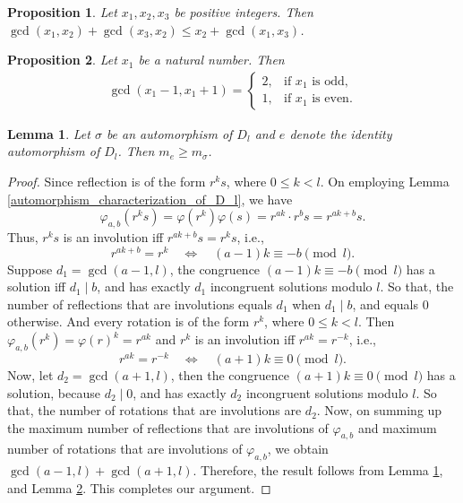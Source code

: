 \documentclass[10pt,a4paper]{amsart}
\newtheorem{lemma}{Lemma}
\newtheorem{proposition}{Proposition}
\begin{document}
    \begin{proposition}\label{gcd_main_supporting_result}
        Let $x_1, x_2, x_3$ be positive integers. Then $\gcd (x_1, x_2) + \gcd (x_3, x_2) \leq x_2 + \gcd (x_1,x_3)$.
    \end{proposition}

    \begin{proposition}\label{gcd_secondary_supporting_result}
        Let $x_1$ be a natural number. Then
        \begin{align*}
            \gcd(x_1-1,x_1+1)=
            \begin{cases}
                2, & \text{if $x_1$ is odd},\\[4pt]
                1, & \text{if $x_1$ is even}.
            \end{cases}
        \end{align*}
    \end{proposition}

       \begin{lemma}\label{identity_greater_other}
            Let $\sigma$ be an automorphism of $D_l$ and $e$ denote the identity automorphism of $D_l$. Then $m_e \geq m_{\sigma}$.
        \end{lemma}

        \begin{proof}
            
             Since reflection is of the form \(r^ks \), where \(0\le k<l\). On employing Lemma \ref{automorphism_characterization_of_D_l}, we have
             \[
                \varphi_{a,b}(r^ks)=\varphi(r^k)\varphi(s) = r^{ak}\cdot r^bs  = r^{ak+b}s.
             \]
            Thus, \(r^ks\) is an involution iff \(r^{ak+b}s =  r^ks\), i.e.,
            \[
                r^{ak+b} = r^k \quad\Longleftrightarrow\quad (a-1)k \equiv -b \pmod l. \tag{1}
            \]
            Suppose $d_1=\gcd(a-1,l)$, the congruence \((a-1)k\equiv -b\pmod l\) has a solution iff \(d_1\mid b\), and has exactly \(d_1\) incongruent solutions modulo \(l\). So that, the number of reflections that are involutions equals \(d_1\) when \(d_1\mid b\), and equals \(0\) otherwise.
            And every rotation is of the form \(r^k\), where \(0\le k<l\). Then $\varphi_{a,b}(r^k)=\varphi(r)^k=r^{ak}$ and \(r^k\) is an involution iff \(r^{ak} = r^{-k}\), i.e.,
            \[
                r^{ak} = r^{-k} \quad\Longleftrightarrow\quad (a+1)k \equiv 0 \pmod l. \tag{2}
            \]
            Now, let \(d_2=\gcd(a+1,l)\), then the congruence \((a+1)k\equiv 0\pmod l\) has a solution, because \(d_2\mid 0\), and has exactly \(d_2\) incongruent solutions modulo \(l\). So that, the number of rotations that are involutions are $d_2$. Now, on summing up the maximum number of reflections that are involutions of $\varphi_{a, b}$ and maximum number of rotations that are involutions of $\varphi_{a, b}$, we obtain $\gcd(a - 1, l) + \gcd(a + 1, l)$. Therefore, the result follows from Lemma \ref{gcd_main_supporting_result}, and Lemma \ref{gcd_secondary_supporting_result}. This completes our argument.
        \end{proof}
\end{document}

